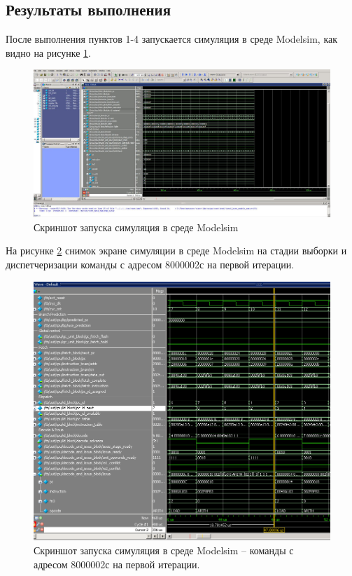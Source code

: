 \clearpage

\subsection*{Результаты выполнения}

После выполнения пунктов 1-4 запускается симуляция в среде Modelsim, как видно на рисунке \ref{img:modelsim}.

\begin{figure}[h]
	\centering
	\includegraphics[height=0.33\textheight]{img/sim-modelsim.jpg}
	\caption{Скриншот запуска симуляция в среде Modelsim}
	\label{img:modelsim}
\end{figure}

\clearpage

На рисунке \ref{img:t2-modelsim} снимок экране симуляции в среде Modelsim на стадии выборки и диспетчеризации  команды с адресом 8000002с на первой итерации.

\begin{figure}[h]
	\centering
	\includegraphics[height=0.57\textheight]{img/t2-modelsim}
	\caption{Скриншот запуска симуляция в среде Modelsim -- команды с адресом 8000002с на первой итерации.}
	\label{img:t2-modelsim}
\end{figure}

